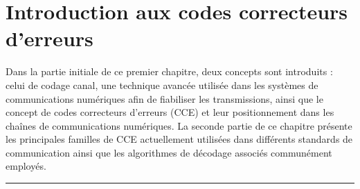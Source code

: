 \documentclass[../main.tex]{subfiles}
\begin{document}
%
%
%
%
\chapter{Introduction aux codes correcteurs d'erreurs} 
\label{chapter:2}
%
%
%
%
%
Dans la partie initiale de ce premier chapitre, deux concepts sont introduits : celui de codage canal, une technique avancée utilisée dans les systèmes de communications numériques afin de fiabiliser les transmissions, ainsi que le concept de codes correcteurs d'erreurs (CCE) et leur positionnement dans les chaînes de communications numériques. La seconde partie de ce chapitre présente les principales familles de CCE actuellement utilisées dans différents standards de communication ainsi que les algorithmes de décodage associés communément employés. 
%
%
%
%
%
%
%
\etocsettocstyle{
    { \large \hspace{-1.5 em} \textbf{} \hfill}
    \vspace{-2.5 em}\\\par\noindent\rule{\linewidth}{1 pt}\vspace{-.2 em}
    }
{\par\noindent\rule{\linewidth}{1 pt}\\}
\localtableofcontents
%
%
%
%
%
%
%
%
\end{document}
